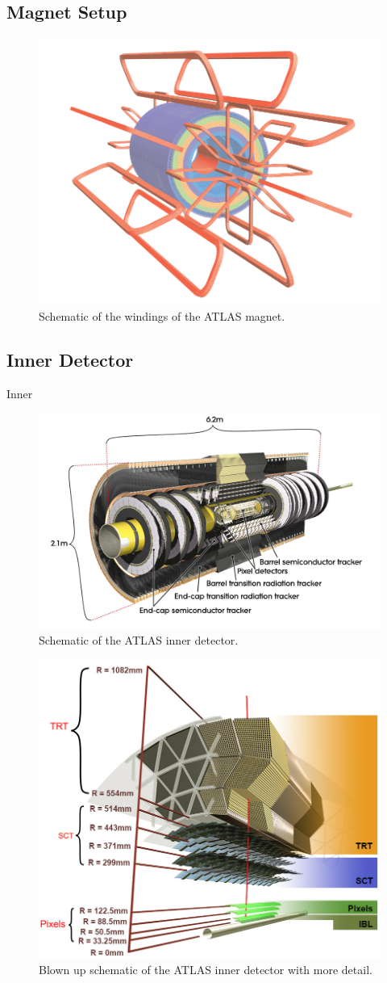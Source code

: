 \subsection{Magnet Setup}
\begin{figure}[h!]
	\centering
	\includegraphics[width=0.5\columnwidth]{../ThesisImages/LHCImages/ATLASMagnetWinding.png}
	\caption[Schematic of the windings of the ATLAS magnet.]{Schematic of the windings of the ATLAS magnet.\cite{ATLAS}
	}
	\label{fig:ATLASMagnetWinding}
\end{figure}

\subsection{Inner Detector}

Inner
\begin{figure}[h!]
	\centering
	\includegraphics[width=0.5\columnwidth]{../ThesisImages/LHCImages/ATLASInnerDetector.png}
	\caption[Schematic of the ATLAS inner detector.]{Schematic of the ATLAS inner detector.\cite{ATLAS}
	}
	\label{fig:ATLASInnerDet}
\end{figure}


\begin{figure}[h!]
	\centering
	\includegraphics[width=0.5\columnwidth]{../ThesisImages/LHCImages/ATLASInnerStructure.png}
	\caption[Blown up schematic of the ATLAS inner detector with more detail.]{Blown up schematic of the ATLAS inner detector with more detail.\cite{ATLAS}
	}
	\label{fig:ATLASInnerDet}
\end{figure}

